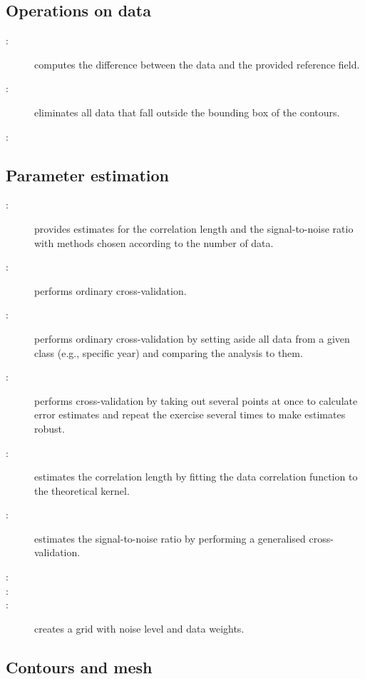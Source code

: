 \subsection{Operations on data}

\begin{description}
\item[:] computes the difference between the data and the provided reference field. 
\item[:] eliminates all data that fall outside the bounding box of the contours.
\item[:] 
\end{description}


\subsection{Parameter estimation}

\begin{description}
\item[:] provides estimates for the correlation length and the signal-to-noise ratio with methods chosen according to the number of data.
\item[:] performs ordinary cross-validation.
\item[:] performs ordinary cross-validation by setting aside all data from a given class (e.g., specific year) and comparing the analysis to them.
\item[:] performs cross-validation by taking out several points at once to calculate error estimates and repeat the exercise several times to make estimates robust.
\item[:] estimates the correlation length by fitting the data correlation function to the theoretical kernel. 
\item[:] estimates the signal-to-noise ratio by performing a generalised cross-validation.
\item[:] 
\item[:] 
\item[:] creates a grid with noise level and data weights.
\end{description}

\subsection{Contours and mesh}

